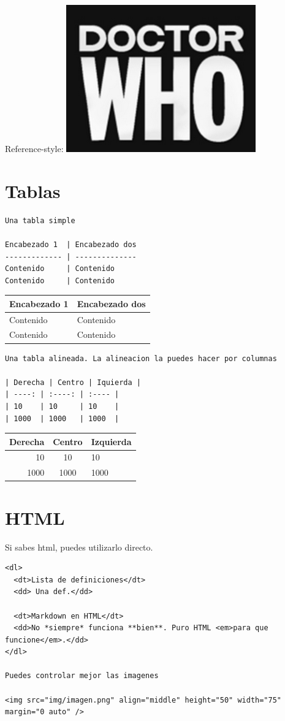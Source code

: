 \documentclass[]{article}
\begin{document}
Reference-style: \includegraphics{dw.png}

\section{Tablas}\label{tablas}

\begin{verbatim}
Una tabla simple 

Encabezado 1  | Encabezado dos
------------- | --------------
Contenido     | Contenido
Contenido     | Contenido 
\end{verbatim}

\begin{longtable}[]{@{}ll@{}}
\toprule
Encabezado 1 & Encabezado dos\tabularnewline
\midrule
\endhead
Contenido & Contenido\tabularnewline
Contenido & Contenido\tabularnewline
\bottomrule
\end{longtable}

\begin{verbatim}
Una tabla alineada. La alineacion la puedes hacer por columnas

| Derecha | Centro | Iquierda |
| ----: | :----: | :---- |
| 10    | 10     | 10    |
| 1000  | 1000   | 1000  |
\end{verbatim}

\begin{longtable}[]{@{}rcl@{}}
\toprule
Derecha & Centro & Izquierda\tabularnewline
\midrule
\endhead
10 & 10 & 10\tabularnewline
1000 & 1000 & 1000\tabularnewline
\bottomrule
\end{longtable}

\section{HTML}\label{html}

Si sabes html, puedes utilizarlo directo.

\begin{verbatim}
<dl>
  <dt>Lista de definiciones</dt>
  <dd> Una def.</dd>

  <dt>Markdown en HTML</dt>
  <dd>No *siempre* funciona **bien**. Puro HTML <em>para que funcione</em>.</dd>
</dl>

Puedes controlar mejor las imagenes

<img src="img/imagen.png" align="middle" height="50" width="75" margin="0 auto" />
\end{verbatim}
\end{document}
